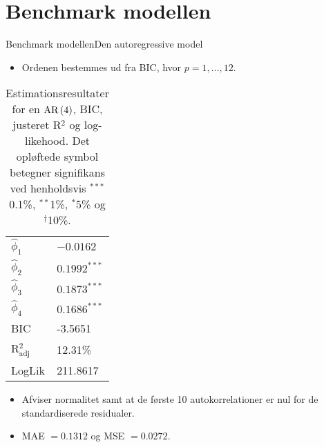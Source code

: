 \section{Benchmark modellen}
\begin{frame}{Benchmark modellen}{Den autoregressive model}
\begin{itemize}
\item Ordenen bestemmes ud fra BIC, hvor \(p = 1,\ldots, 12\).
\end{itemize}
\begin{table}[h]
\center
\begin{tabular}{ll}
\toprule
$\widehat{\phi}_1$ &$ -0.0162 $ \\
$\widehat{\phi}_2$ & $0.1992^{***}$  \\
$\widehat{\phi}_3$ &$0.1873^{***}$  \\
$\widehat{\phi}_4$ &$0.1686^{***} $ \\ \midrule
BIC & -3.5651 \\
 R$^2_{\text{adj}}$ & 12.31\% \\
LogLik &  211.8617\\ \bottomrule
 \end{tabular}
\caption{Estimationsresultater for en \(\text{AR} \del{4}\), BIC, justeret R$^2$ og log-likehood. Det opløftede symbol betegner signifikans ved henholdsvis $^{***}$0.1\%, $^{**}$1\%, $^{*}$5\% og $^{\dagger}$10\%.} \label{tab:est_ar}
\end{table}
\begin{itemize}
\item Afviser normalitet samt at de første 10 autokorrelationer er nul for de standardiserede residualer.
\item MAE $= 0.1312$ og MSE $= 0.0272$.
\end{itemize}
\end{frame}


